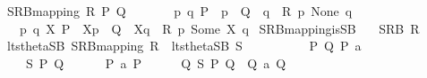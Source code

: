 \begin{isabellebody}
\ \ \ {\isacartoucheopen}SRB{\isacharunderscore}{\kern0pt}mapping\ R\ P\ Q\ {\isasymequiv}\ \isanewline
\ \ \ \ {\isacharparenleft}{\kern0pt}{\isasymexists}\ p\ q{\isachardot}{\kern0pt}\ P\ {\isacharequal}{\kern0pt}\ {\isasymtheta}{\isacharparenleft}{\kern0pt}p{\isacharparenright}{\kern0pt}\ {\isasymand}\ Q\ {\isacharequal}{\kern0pt}\ {\isasymtheta}{\isacharparenleft}{\kern0pt}q{\isacharparenright}{\kern0pt}\ {\isasymand}\ R\ p\ None\ q{\isacharparenright}{\kern0pt}\ {\isasymor}\isanewline
\ \ \ \ {\isacharparenleft}{\kern0pt}{\isasymexists}\ p\ q\ X{\isachardot}{\kern0pt}\ P\ {\isacharequal}{\kern0pt}\ {\isasymtheta}{\isacharbrackleft}{\kern0pt}X{\isacharbrackright}{\kern0pt}{\isacharparenleft}{\kern0pt}p{\isacharparenright}{\kern0pt}\ {\isasymand}\ Q\ {\isacharequal}{\kern0pt}\ {\isasymtheta}{\isacharbrackleft}{\kern0pt}X{\isacharbrackright}{\kern0pt}{\isacharparenleft}{\kern0pt}q{\isacharparenright}{\kern0pt}\ {\isasymand}\ R\ p\ {\isacharparenleft}{\kern0pt}Some\ X{\isacharparenright}{\kern0pt}\ q{\isacharparenright}{\kern0pt}{\isacartoucheclose}\isanewline
\isanewline
{}\isamarkupfalse%
\ SRB{\isacharunderscore}{\kern0pt}mapping{\isacharunderscore}{\kern0pt}is{\isacharunderscore}{\kern0pt}SB{\isacharcolon}{\kern0pt}\isanewline
\ \ \ {\isacartoucheopen}SRB\ R{\isacartoucheclose}\isanewline
\ \ \ {\isacartoucheopen}lts{\isacharunderscore}{\kern0pt}theta{\isachardot}{\kern0pt}SB\ {\isacharparenleft}{\kern0pt}SRB{\isacharunderscore}{\kern0pt}mapping\ R{\isacharparenright}{\kern0pt}{\isacartoucheclose}\ {\isacharparenleft}{\kern0pt}\ {\isacartoucheopen}lts{\isacharunderscore}{\kern0pt}theta{\isachardot}{\kern0pt}SB\ {\isacharquery}{\kern0pt}S{\isacartoucheclose}{\isacharparenright}{\kern0pt}\isanewline
%
\isadelimproof
%
\endisadelimproof
%
\isatagproof
{}\isamarkupfalse%
\ {\isacharminus}{\kern0pt}\isanewline
\ \ \isacommand{{\isacharbraceleft}{\kern0pt}}\isamarkupfalse%
\isanewline
\ \ \ \ \isamarkupfalse%
\ P\ Q\ P{\isacharprime}{\kern0pt}\ a\isanewline
\ \ \ \ \isamarkupfalse%
\isanewline
\ \ \ \ \ \ {\isacartoucheopen}{\isacharquery}{\kern0pt}S\ P\ Q{\isacartoucheclose}\isanewline
\ \ \ \ \ \ {\isacartoucheopen}P\ {\isasymlongmapsto}\isactrlsup {\isasymtheta}a\ P{\isacharprime}{\kern0pt}{\isacartoucheclose}\isanewline
\ \ \ \ \isamarkupfalse%
\ {\isacartoucheopen}{\isasymexists}Q{\isacharprime}{\kern0pt}{\isachardot}{\kern0pt}\ {\isacharquery}{\kern0pt}S\ P{\isacharprime}{\kern0pt}\ Q{\isacharprime}{\kern0pt}\ {\isasymand}\ Q\ {\isasymlongmapsto}\isactrlsup {\isasymtheta}a\ Q{\isacharprime}{\kern0pt}{\isacartoucheclose}\isanewline

\end{isabellebody}
